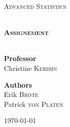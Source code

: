 \begin{titlepage}
\begin{center}


\hfill

\vfill 

\textsc{\Large Advanced Statistics}\\[0.5cm]

\vfill

\HRule \\[0.4cm]
{ \LARGE \bfseries \textsc{Assignement}\\[0.4cm] }
\HRule \\[1.5cm]


\vfill

{\large
\begin{center}
  \textbf{Professor}\\[0.1cm]
  Christine \textsc{Keribin}
\end{center}
\vfill
\begin{center}
  \textbf{Authors}\\[0.1cm]
  Erik \textsc{Bröte}\\[0.1cm]
  Patrick \textsc{von Platen}
\end{center}
}

\vfill

{\large \today}

\end{center}
\end{titlepage}